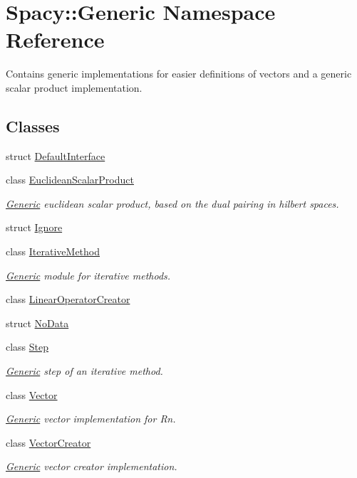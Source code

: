 \hypertarget{namespaceSpacy_1_1Generic}{}\section{Spacy\+:\+:Generic Namespace Reference}
\label{namespaceSpacy_1_1Generic}


Contains generic implementations for easier definitions of vectors and a generic scalar product implementation.  


\subsection*{Classes}
\begin{DoxyCompactItemize}
\item 
struct \hyperlink{structSpacy_1_1Generic_1_1DefaultInterface}{Default\+Interface}
\item 
class \hyperlink{classSpacy_1_1Generic_1_1EuclideanScalarProduct}{Euclidean\+Scalar\+Product}
\begin{DoxyCompactList}\small\item\em \hyperlink{namespaceSpacy_1_1Generic}{Generic} euclidean scalar product, based on the dual pairing in hilbert spaces. \end{DoxyCompactList}\item 
struct \hyperlink{structSpacy_1_1Generic_1_1Ignore}{Ignore}
\item 
class \hyperlink{classSpacy_1_1Generic_1_1IterativeMethod}{Iterative\+Method}
\begin{DoxyCompactList}\small\item\em \hyperlink{namespaceSpacy_1_1Generic}{Generic} module for iterative methods. \end{DoxyCompactList}\item 
class \hyperlink{classSpacy_1_1Generic_1_1LinearOperatorCreator}{Linear\+Operator\+Creator}
\item 
struct \hyperlink{structSpacy_1_1Generic_1_1NoData}{No\+Data}
\item 
class \hyperlink{classSpacy_1_1Generic_1_1Step}{Step}
\begin{DoxyCompactList}\small\item\em \hyperlink{namespaceSpacy_1_1Generic}{Generic} step of an iterative method. \end{DoxyCompactList}\item 
class \hyperlink{classSpacy_1_1Generic_1_1Vector}{Vector}
\begin{DoxyCompactList}\small\item\em \hyperlink{namespaceSpacy_1_1Generic}{Generic} vector implementation for Rn. \end{DoxyCompactList}\item 
class \hyperlink{classSpacy_1_1Generic_1_1VectorCreator}{Vector\+Creator}
\begin{DoxyCompactList}\small\item\em \hyperlink{namespaceSpacy_1_1Generic}{Generic} vector creator implementation. \end{DoxyCompactList}\end{DoxyCompactItemize}
